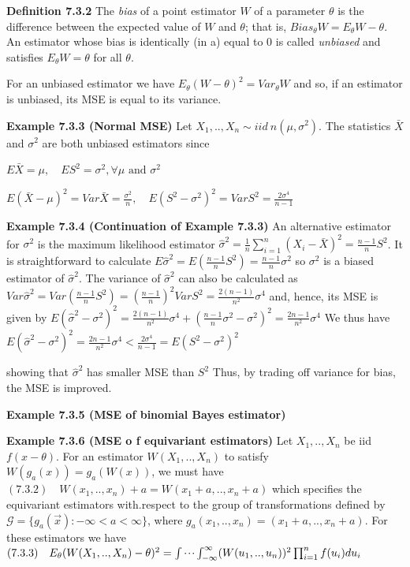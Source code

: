 \documentclass[10pt,twocolumn,portrait]{article}
\begin{document}
\textbf{Definition 7.3.2} The \emph{bias} of a point estimator \(W\) of
a parameter \(\theta\) is the difference between the expected value of
\(W\) and \(\theta\); that is, \(Bias_{\theta}W=E_{\theta}W-\theta\). An
estimator whose bias is identically (in a) equal to 0 is called
\emph{unbiased} and satisfies \(E_{\theta}W=\theta\) for all \(\theta\).

For an unbiased estimator we have
\(E_{\theta}(W-\theta)^2=Var_{\theta}W\) and so, if an estimator is
unbiased, its MSE is equal to its variance.

\textbf{Example 7.3.3 (Normal MSE)} Let
\(X_1,..,X_n\sim iid\ n(\mu,\sigma^2)\). The statistics \(\bar X\) and
\(\sigma^2\) are both unbiased estimators since

\(E\bar X=\mu,\quad ES^2=\sigma^2, \forall\mu \text{ and } \sigma^2\)

\(E(\bar X-\mu)^2=Var\bar X=\frac{\sigma^2}{n},\quad E(S^2-\sigma^2)^2=VarS^2=\frac{2\sigma^4}{n-1}\)

\textbf{Example 7.3.4 (Continuation of Example 7.3.3)} An alternative
estimator for \(\sigma^2\) is the maximum likelihood estimator
\(\hat\sigma^2=\frac1n\sum_{i=1}^n(X_i-\bar X)^2=\frac{n-1}nS^2\). It is
straightforward to calculate
\(E\hat\sigma^2=E\left(\frac{n-1}nS^2\right)=\frac{n-1}n\sigma^2\) so
\(\sigma^2\) is a biased estimator of \(\hat\sigma^2\). The variance of
\(\hat\sigma^2\) can also be calculated as
\(Var\hat\sigma^2=Var\left(\frac{n-1}nS^2\right)=\left(\frac{n-1}n\right)^2VarS^2=\frac{2(n-1)}{n^2}\sigma^4\)
and, hence, its MSE is given by
\(E(\hat\sigma^2-\sigma^2)^2=\frac{2(n-1)}{n^2}\sigma^4+\left(\frac{n-1}n\sigma^2-\sigma^2\right)^2=\frac{2n-1}{n^2}\sigma^4\)
We thus have
\(E(\hat\sigma^2-\sigma^2)^2=\frac{2n-1}{n^2}\sigma^4<\frac{2\sigma^4}{n-1}=E(S^2-\sigma^2)^2\)

showing that \(\hat\sigma^2\) has smaller MSE than \(S^2\) Thus, by
trading off variance for bias, the MSE is improved.

\textbf{Example 7.3.5 (MSE of binomial Bayes estimator)}

\textbf{Example 7.3.6 (MSE o f equivariant estimators)} Let
\(X_1,..,X_n\) be iid \(f(x-\theta)\). For an estimator
\(W(X_1,..,X_n)\) to satisfy \(W(g_a(x))=g_a(W(x))\), we must have
\((7.3.2)\quad W(x_1,..,x_n)+a=W(x_1+a,..,x_n+a)\) which specifies the
equivariant estimators with.respect to the group of transformations
defined by \(\mathcal{G}=\{g_a(\vec x):-\infty<a<\infty\}\), where
\(g_a(x_1,..,x_n)=(x_1+a,..,x_n+a)\). For these estimators we have
\((7.3.3)\quad E_\theta(W(X_1,..,X_n)-\theta)^2=\idotsint^\infty_{-\infty}(W(u_1,..,u_n))^2\prod^n_{i=1}f(u_i)du_i\)
\end{document}
